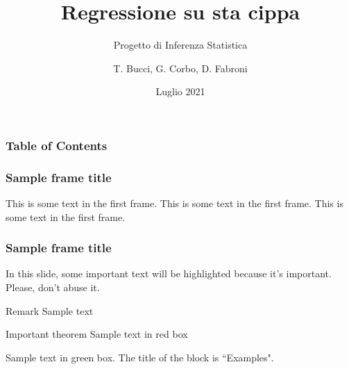 \documentclass{beamer}
\title{Regressione su sta cippa}
\subtitle{Progetto di Inferenza Statistica}
\author{T. Bucci, G. Corbo, D. Fabroni}
\date{Luglio 2021}
\begin{document}
\frame{\titlepage}

\begin{frame}
\frametitle{Table of Contents}
\tableofcontents
\end{frame}


\begin{frame}
\frametitle{Sample frame title}
This is some text in the first frame. This is some text in the first frame. This is some text in the first frame.
\end{frame}






\begin{frame}
\frametitle{Sample frame title}

In this slide, some important text will be
\alert{highlighted} because it's important.
Please, don't abuse it.

\begin{block}{Remark}
Sample text
\end{block}

\begin{alertblock}{Important theorem}
Sample text in red box
\end{alertblock}

\begin{examples}
Sample text in green box. The title of the block is ``Examples".
\end{examples}
\end{frame}
\end{document}
